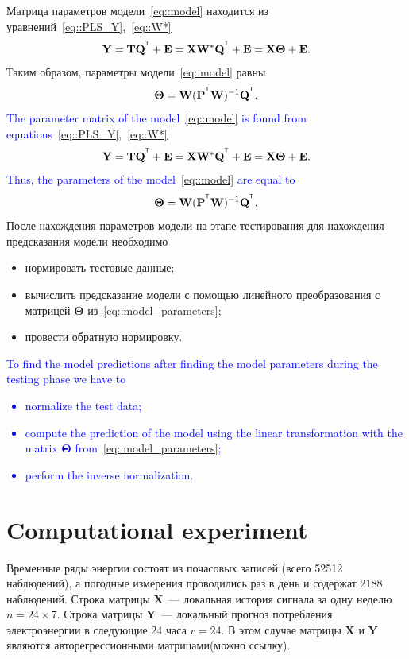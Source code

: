 \documentclass[12pt,twoside]{article}
\newcommand{\bY}{\mathbf{Y}}
\newcommand{\bX}{\mathbf{X}}
\newcommand{\bP}{\mathbf{P}}
\newcommand{\bT}{\mathbf{T}}
\newcommand{\bQ}{\mathbf{Q}}
\newcommand{\bE}{\mathbf{E}}
\newcommand{\bW}{\mathbf{W}}
\newcommand{\bTheta}{\boldsymbol{\Theta}}
\newcommand{\T}{^{\text{\tiny\sffamily\upshape\mdseries T}}}
\begin{document}
Матрица параметров модели~\ref{eq::model} находится из уравнений~\eqref{eq::PLS_Y},~\eqref{eq::W*}
\begin{equation*}
    \bY = \bT \bQ^{\T} + \bE = \bX \bW^* \bQ^{\T} + \bE = \bX \bTheta + \bE.
\end{equation*}
Таким образом, параметры модели~\eqref{eq::model} равны
\begin{equation}
    \bTheta = \bW (\bP^{\T} \bW)^{-1} \bQ^{\T}.
    \label{eq::model_parameters}
\end{equation}
\textcolor{blue}{
The parameter matrix of the model~\ref{eq::model} is found from equations~\eqref{eq::PLS_Y},~\eqref{eq::W*}
\begin{equation*}
    \bY = \bT \bQ^{\T} + \bE = \bX \bW^* \bQ^{\T} + \bE = \bX \bTheta + \bE.
\end{equation*}
Thus, the parameters of the model~\eqref{eq::model} are equal to
\begin{equation}
    \bTheta = \bW (\bP^{\T} \bW)^{-1} \bQ^{\T}.
    \label{eq::model_parameters}
\end{equation}}
После нахождения параметров модели на этапе тестирования для нахождения предсказания модели необходимо
\begin{itemize}
	\item нормировать тестовые данные;	
	\item вычислить предсказание модели с помощью линейного преобразования с матрицей $\bTheta$ из~\eqref{eq::model_parameters};
	\item провести обратную нормировку.
\end{itemize}
\textcolor{blue}{
To find the model predictions after finding the model parameters during the testing phase we have to
\begin{itemize}
	\item normalize the test data;
	\item compute the prediction of the model using the linear transformation with the matrix $\bTheta$ from~\eqref{eq::model_parameters};
	\item perform the inverse normalization.
\end{itemize}}
\section{Computational experiment}
Временные ряды энергии состоят из почасовых записей (всего 52512 наблюдений), а погодные измерения проводились раз в день и содержат 2188 наблюдений. 
Строка матрицы $\bX$~--– локальная история сигнала за одну неделю $n = 24 \times 7$. Строка матрицы $\bY$~--- локальный прогноз потребления электроэнергии в следующие 24 часа $r = 24$. В этом случае матрицы $\bX$ и $\bY$ являются авторегрессионными матрицами(можно ссылку).
\end{document}
